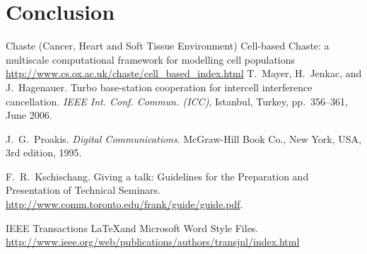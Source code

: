 \documentclass[journal, a4paper]{IEEEtran}
\begin{document}
\section{Conclusion}
\begin{thebibliography}{5}

	Chaste (Cancer, Heart and Soft Tissue Environment) Cell-based Chaste: a multiscale computational framework for modelling cell populations
	\url{http://www.cs.ox.ac.uk/chaste/cell_based_index.html}
	T.~Mayer, H.~Jenkac, and J.~Hagenauer. Turbo base-station cooperation for intercell interference cancellation. {\em IEEE Int. Conf. Commun. (ICC)}, Istanbul, Turkey, pp.~356--361, June 2006.

	J.~G.~Proakis. {\em Digital Communications}. McGraw-Hill Book Co.,
	New York, USA, 3rd edition, 1995.

	F.~R.~Kschischang. Giving a talk: Guidelines for the Preparation and Presentation of Technical Seminars.
	\url{http://www.comm.toronto.edu/frank/guide/guide.pdf}.

	IEEE Transactions \LaTeX and Microsoft Word Style Files.
	\url{http://www.ieee.org/web/publications/authors/transjnl/index.html}

\end{thebibliography}

\end{document}
